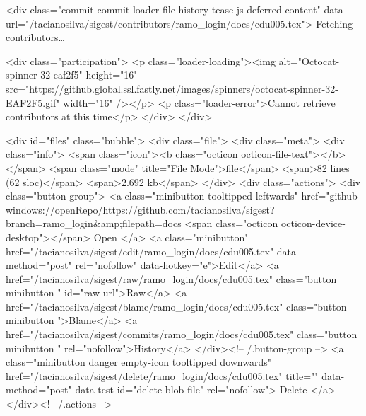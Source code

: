   <div class="commit commit-loader file-history-tease js-deferred-content" data-url="/tacianosilva/sigest/contributors/ramo_login/docs/cdu005.tex">
    Fetching contributors…

    <div class="participation">
      <p class="loader-loading"><img alt="Octocat-spinner-32-eaf2f5" height="16" src="https://github.global.ssl.fastly.net/images/spinners/octocat-spinner-32-EAF2F5.gif" width="16" /></p>
      <p class="loader-error">Cannot retrieve contributors at this time</p>
    </div>
  </div>

<div id="files" class="bubble">
  <div class="file">
    <div class="meta">
      <div class="info">
        <span class="icon"><b class="octicon octicon-file-text"></b></span>
        <span class="mode" title="File Mode">file</span>
          <span>82 lines (62 sloc)</span>
        <span>2.692 kb</span>
      </div>
      <div class="actions">
        <div class="button-group">
            <a class="minibutton tooltipped leftwards"
               href="github-windows://openRepo/https://github.com/tacianosilva/sigest?branch=ramo_login&amp;filepath=docs%
                <span class="octicon octicon-device-desktop"></span> Open
            </a>
                <a class="minibutton"
                   href="/tacianosilva/sigest/edit/ramo_login/docs/cdu005.tex"
                   data-method="post" rel="nofollow" data-hotkey="e">Edit</a>
          <a href="/tacianosilva/sigest/raw/ramo_login/docs/cdu005.tex" class="button minibutton " id="raw-url">Raw</a>
            <a href="/tacianosilva/sigest/blame/ramo_login/docs/cdu005.tex" class="button minibutton ">Blame</a>
          <a href="/tacianosilva/sigest/commits/ramo_login/docs/cdu005.tex" class="button minibutton " rel="nofollow">History</a>
        </div><!-- /.button-group -->
          <a class="minibutton danger empty-icon tooltipped downwards"
             href="/tacianosilva/sigest/delete/ramo_login/docs/cdu005.tex"
             title=""
             data-method="post" data-test-id="delete-blob-file" rel="nofollow">
          Delete
        </a>
      </div><!-- /.actions -->

